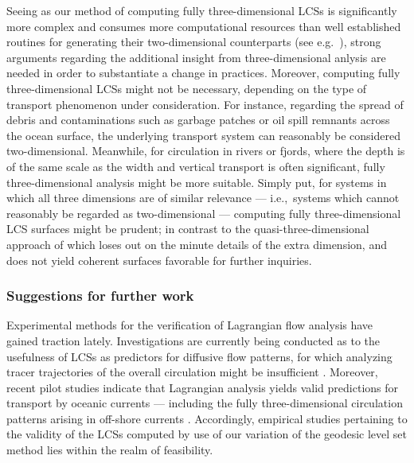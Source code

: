Seeing as our method of computing fully three-dimensional LCSs is significantly
more complex and consumes more computational resources than well established
routines for generating their two-dimensional counterparts (see e.g.\
\textcite{onu2015lcstool}), strong arguments regarding the additional insight
from three-dimensional anlysis are needed in order to substantiate a change in
practices. Moreover, computing fully three-dimensional LCSs might not be
necessary, depending on the type of transport phenomenon under consideration.
For instance, regarding the spread of debris and contaminations such as garbage
patches or oil spill remnants across the ocean surface, the underlying
transport system can reasonably be considered two-dimensional. Meanwhile, for
circulation in rivers or fjords, where the depth is of the same scale as the
width and vertical transport is often significant, fully three-dimensional
analysis might be more suitable. Simply put, for systems in which all three
dimensions are of similar relevance --- i.e.,\ systems which cannot reasonably
be regarded as two-dimensional --- computing fully three-dimensional LCS
surfaces might be prudent; in contrast to the quasi-three-dimensional approach
of \textcite{blazevski2014hyperbolic} which loses out on the minute details
of the extra dimension, and does not yield coherent surfaces favorable for
further inquiries.

\subsubsection{Suggestions for further work}
\label{ssub:suggestions_for_further_work}

Experimental methods for the verification of Lagrangian flow analysis have
gained traction lately. Investigations are currently being conducted as to the
usefulness of LCSs as predictors for diffusive flow patterns, for which
analyzing tracer trajectories of the overall circulation might be insufficient
\parencite{haller2018material}. Moreover, recent pilot studies indicate that
Lagrangian analysis yields valid predictions for transport by oceanic currents
\parencite{filippi2018detection} --- including the fully three-dimensional
circulation patterns arising in off-shore currents
\parencite{peacock2018targeted}. Accordingly, empirical studies pertaining to
the validity of the LCSs computed by use of our variation of the geodesic level
set method lies within the realm of feasibility.

